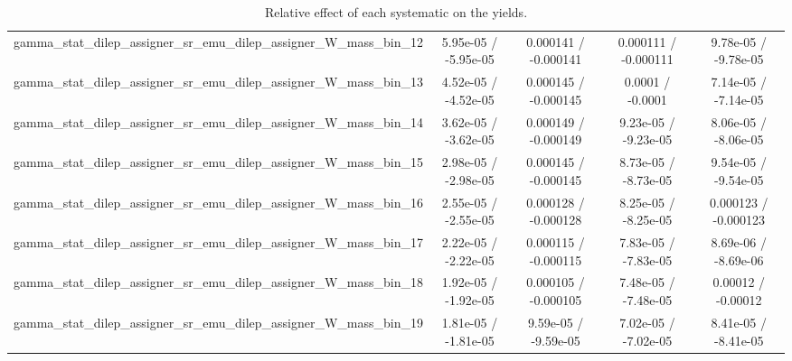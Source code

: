\documentclass[10pt]{article}
\begin{document}
\begin{table}[htbp]
\begin{center}
\begin{tabular}{|c|c|c|c|c|}
  gamma_stat_dilep_assigner_sr_emu_dilep_assigner_W_mass_bin_12 & 5.95e-05 / -5.95e-05 & 0.000141 / -0.000141 & 0.000111 / -0.000111 & 9.78e-05 / -9.78e-05 \\ 
  gamma_stat_dilep_assigner_sr_emu_dilep_assigner_W_mass_bin_13 & 4.52e-05 / -4.52e-05 & 0.000145 / -0.000145 & 0.0001 / -0.0001 & 7.14e-05 / -7.14e-05 \\ 
  gamma_stat_dilep_assigner_sr_emu_dilep_assigner_W_mass_bin_14 & 3.62e-05 / -3.62e-05 & 0.000149 / -0.000149 & 9.23e-05 / -9.23e-05 & 8.06e-05 / -8.06e-05 \\ 
  gamma_stat_dilep_assigner_sr_emu_dilep_assigner_W_mass_bin_15 & 2.98e-05 / -2.98e-05 & 0.000145 / -0.000145 & 8.73e-05 / -8.73e-05 & 9.54e-05 / -9.54e-05 \\ 
  gamma_stat_dilep_assigner_sr_emu_dilep_assigner_W_mass_bin_16 & 2.55e-05 / -2.55e-05 & 0.000128 / -0.000128 & 8.25e-05 / -8.25e-05 & 0.000123 / -0.000123 \\ 
  gamma_stat_dilep_assigner_sr_emu_dilep_assigner_W_mass_bin_17 & 2.22e-05 / -2.22e-05 & 0.000115 / -0.000115 & 7.83e-05 / -7.83e-05 & 8.69e-06 / -8.69e-06 \\ 
  gamma_stat_dilep_assigner_sr_emu_dilep_assigner_W_mass_bin_18 & 1.92e-05 / -1.92e-05 & 0.000105 / -0.000105 & 7.48e-05 / -7.48e-05 & 0.00012 / -0.00012 \\ 
  gamma_stat_dilep_assigner_sr_emu_dilep_assigner_W_mass_bin_19 & 1.81e-05 / -1.81e-05 & 9.59e-05 / -9.59e-05 & 7.02e-05 / -7.02e-05 & 8.41e-05 / -8.41e-05 \\ 
\hline 
\end{tabular} 
\caption{Relative effect of each systematic on the yields.} 
\end{center} 
\end{table} 
\end{document}
